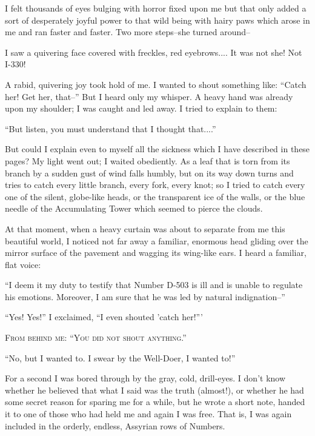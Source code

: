 \documentclass[11pt,openany]{book}
\begin{document}
I felt thousands of eyes bulging with horror fixed upon me but that only added a sort of desperately joyful power to that wild being with hairy paws which arose in me and ran faster and faster. Two more steps--she turned around--

I saw a quivering face covered with freckles, red eyebrows.... It was not she! Not I-330!

A rabid, quivering joy took hold of me. I wanted to shout something like: ``Catch her! Get her, that--'' But I heard only my whisper. A heavy hand was already upon my shoulder; I was caught and led away. I tried to explain to them:

``But listen, you must understand that I thought that....''

But could I explain even to myself all the sickness which I have described in these pages? My light went out; I waited obediently. As a leaf that is torn from its branch by a sudden gust of wind falls humbly, but on its way down turns and tries to catch every little branch, every fork, every knot; so I tried to catch every one of the silent, globe-like heads, or the transparent ice of the walls, or the blue needle of the Accumulating Tower which seemed to pierce the clouds.

At that moment, when a heavy curtain was about to separate from me this beautiful world, I noticed not far away a familiar, enormous head gliding over the mirror surface of the pavement and wagging its wing-like ears. I heard a familiar, flat voice:

``I deem it my duty to testify that Number D-503 is ill and is unable to regulate his emotions. Moreover, I am sure that he was led by natural indignation--''

``Yes! Yes!'' I exclaimed, ``I even shouted 'catch her!'''

\begin{center}\textsc{From behind me: ``You did not shout anything.''}\end{center}

``No, but I wanted to. I swear by the Well-Doer, I wanted to!''

For a second I was bored through by the gray, cold, drill-eyes. I don't know whether he believed that what I said was the truth (almost!), or whether he had some secret reason for sparing me for a while, but he wrote a short note, handed it to one of those who had held me and again I was free. That is, I was again included in the orderly, endless, Assyrian rows of Numbers.
\end{document}
